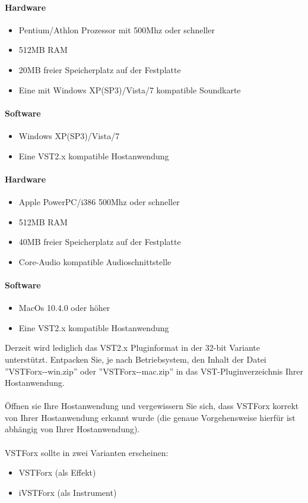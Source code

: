 	\paragraph{Hardware}
		\begin{itemize}
			\item Pentium/Athlon Prozessor mit 500Mhz oder schneller
			\item 512MB RAM
			\item 20MB freier Speicherplatz auf der Festplatte
			\item Eine mit Windows XP(SP3)/Vista/7 kompatible Soundkarte
		\end{itemize}
	\paragraph{Software}
		\begin{itemize}
			\item Windows XP(SP3)/Vista/7
			\item Eine VST2.x kompatible Hostanwendung
		\end{itemize}
	\paragraph{Hardware}
		\begin{itemize}
			\item Apple PowerPC/i386 500Mhz oder schneller
			\item 512MB RAM
			\item 40MB freier Speicherplatz auf der Festplatte
			\item Core-Audio kompatible Audioschnittstelle
		\end{itemize}
	\paragraph{Software}
		\begin{itemize}
			\item MacOs 10.4.0 oder höher
			\item Eine VST2.x kompatible Hostanwendung
		\end{itemize}
Derzeit wird lediglich das VST2.x Pluginformat in der 32-bit Variante unterstützt.
\newpage
{}
Entpacken Sie, je nach Betriebsystem, den Inhalt der Datei ''VSTForx-\forxVersion-win.zip'' oder ''VSTForx-\forxVersion-mac.zip'' in das VST-Pluginverzeichnis Ihrer Hostanwendung.
\\\\
Öffnen sie Ihre Hostanwendung und vergewissern Sie sich, dass VSTForx korrekt von Ihrer Hostanwendung erkannt wurde (die genaue Vorgehensweise hierfür ist abhängig von Ihrer Hostanwendung). 
\\\\
VSTForx sollte in zwei Varianten erscheinen:
\begin{itemize}
	\item VSTForx (als Effekt)
	\item iVSTForx (als Instrument)
\end{itemize}

